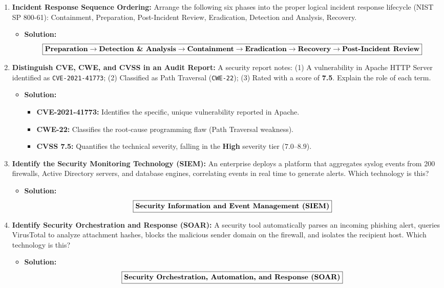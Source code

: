 \begin{enumerate}[label=\textbf{Problem \arabic*.,resume},leftmargin=1.5cm]
\item \textbf{Incident Response Sequence Ordering:}
Arrange the following six phases into the proper logical incident response lifecycle (NIST SP 800-61): Containment, Preparation, Post-Incident Review, Eradication, Detection and Analysis, Recovery.
\begin{itemize}
\item \textbf{Solution:}
\[ \boxed{\text{\textbf{Preparation}} \to \text{\textbf{Detection \& Analysis}} \to \text{\textbf{Containment}} \to \text{\textbf{Eradication}} \to \text{\textbf{Recovery}} \to \text{\textbf{Post-Incident Review}}} \]
\end{itemize}

\item \textbf{Distinguish CVE, CWE, and CVSS in an Audit Report:}
A security report notes: (1) A vulnerability in Apache HTTP Server identified as \texttt{CVE-2021-41773}; (2) Classified as Path Traversal (\texttt{CWE-22}); (3) Rated with a score of \textbf{7.5}. Explain the role of each term.
\begin{itemize}
\item \textbf{Solution:}
\begin{itemize}
\item \textbf{CVE-2021-41773:} Identifies the specific, unique vulnerability reported in Apache.
\item \textbf{CWE-22:} Classifies the root-cause programming flaw (Path Traversal weakness).
\item \textbf{CVSS 7.5:} Quantifies the technical severity, falling in the \textbf{High} severity tier ($7.0$--$8.9$).
\end{itemize}
\end{itemize}

\item \textbf{Identify the Security Monitoring Technology (SIEM):}
An enterprise deploys a platform that aggregates syslog events from 200 firewalls, Active Directory servers, and database engines, correlating events in real time to generate alerts. Which technology is this?
\begin{itemize}
\item \textbf{Solution:}
\[ \boxed{\text{\textbf{Security Information and Event Management (SIEM)}}} \]
\end{itemize}

\item \textbf{Identify Security Orchestration and Response (SOAR):}
A security tool automatically parses an incoming phishing alert, queries VirusTotal to analyze attachment hashes, blocks the malicious sender domain on the firewall, and isolates the recipient host. Which technology is this?
\begin{itemize}
\item \textbf{Solution:}
\[ \boxed{\text{\textbf{Security Orchestration, Automation, and Response (SOAR)}}} \]
\end{itemize}


\end{enumerate}

